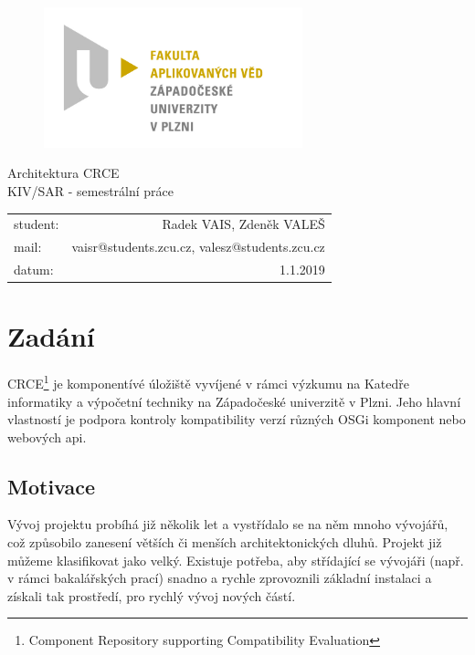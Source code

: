 \documentclass[12pt, a4paper]{article}
\begin{document}
\begin{figure}[h!]
\centering
\includegraphics[bb= 0 0 820 445 , width=75mm]{favlogo.jpg}
\end{figure}

\vspace{5cm}

{\centering
{\huge Architektura CRCE}\\[1em]
{\large KIV/SAR - semestrální práce}\\[7,5cm]
}

\begin{tabular}{l r}
student: & Radek VAIS, Zdeněk VALEŠ\\
mail: & vaisr@students.zcu.cz, valesz@students.zcu.cz\\
datum: & 1.1.2019\\
\end{tabular}

\thispagestyle{empty}
\newpage

\section{Zadání} %

CRCE\footnote{Component Repository supporting Compatibility Evaluation} je komponentívé úložiště vyvíjené v rámci výzkumu na Katedře informatiky a výpočetní techniky na Západočeské univerzitě v Plzni. Jeho hlavní vlastností je podpora kontroly kompatibility verzí různých OSGi komponent nebo webových api.

\subsection{Motivace}

Vývoj projektu probíhá již několik let a vystřídalo se na něm mnoho vývojářů, což způsobilo zanesení větších či menších architektonických dluhů. Projekt již můžeme klasifikovat jako velký. Existuje potřeba, aby střídající se vývojáři (např. v rámci bakalářských prací) snadno a rychle zprovoznili základní instalaci a získali tak prostředí, pro rychlý vývoj nových částí. 
\end{document}
